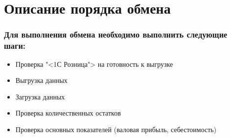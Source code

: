 
\section{Описание порядка обмена}
\subsubsection{Для выполнения обмена необходимо выполнить следующие шаги:}
\begin{itemize}	
	\item Проверка "<1С Розница"> на готовность к выгрузке
	\item Выгрузка данных
	\item Загрузка данных
	\item Проверка количественных остатков
	\item Проверка основных показателей (валовая прибыль, себестоимость)
\end{itemize}